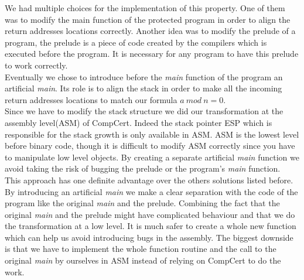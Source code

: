 \documentclass[11pt]{sdm}
\begin{document}
We had multiple choices for the implementation of this property. One of them was to modify the main function of the protected program in order to align the return addresses locations correctly. Another idea was to modify the prelude of a program, the prelude is a piece of code created by the compilers which is executed before the program. It is necessary for any program to have this prelude to work correctly. \\
Eventually we chose to introduce before the \textit{main} function of the program an artificial \textit{main}. Its role is to align the stack in order to make all the incoming return addresses locations to match our formula $a~mod~n=0$. \\
Since we have to modify the stack structure we did our transformation at the assembly level(ASM) of CompCert. Indeed the stack pointer ESP which is responsible for the stack growth is only available in ASM. ASM is the lowest level before binary code, though it is difficult to modify ASM correctly since you have to manipulate low level objects. 
By creating a separate artificial \textit{main} function we avoid taking the risk of bugging the prelude or the program's \textit{main} function.\\
This approach has one definite advantage over the others solutions listed before. 
By introducing an artificial \textit{main} we make a clear separation with the code of the program like the original \textit{main} and the prelude. Combining the fact that the original \textit{main} and the prelude might have complicated behaviour and that we do the transformation at a low level.
It is much safer to create a whole new function which can help us avoid introducing bugs in the assembly. The biggest downside is that we have to implement the whole function routine and the call to the original \textit{main} by ourselves in ASM instead of relying on CompCert to do the work.
\end{document}
